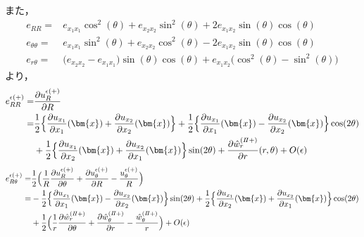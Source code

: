 また，
\begin{align}
	e_{RR}
		=&e_{x_{1}x_{1}}\cos^2(\theta)+e_{x_{2}x_{2}}\sin^2(\theta)+2e_{x_{1}x_{2}}\sin(\theta)\cos(\theta)
		\nonumber
		\\
	e_{\theta\theta}
		=&e_{x_{1}x_{1}}\sin^2(\theta)+e_{x_{2}x_{2}}\cos^2(\theta)-2e_{x_{1}x_{2}}\sin(\theta)\cos(\theta)
		\nonumber
		\\
	e_{r\theta}
		=&\bigl(e_{x_{2}x_{2}}-e_{x_{1}x_{1}}\bigr)\sin(\theta)\cos(\theta)+e_{x_{1}x_{2}}\bigl(\cos^2(\theta)-\sin^2(\theta)\bigr)
\end{align}
より，
\begin{align}
	e_{RR}^{\epsilon(+)}
		=&\frac{\partial u_{R}^{\epsilon(+)}}{\partial R}
		\nonumber
		\\
		=&\frac{1}{2}\Bigl\{ \frac{\partial u_{x_{1}}}{\partial x_{1}}(\bm{x})
			+\frac{\partial u_{x_{2}}}{\partial x_{2}}(\bm{x})\Bigr\}
		+\frac{1}{2}\Bigl\{ \frac{\partial u_{x_{1}}}{\partial x_{1}}(\bm{x})
			-\frac{\partial u_{x_{2}}}{\partial x_{2}}(\bm{x})\Bigr\}\cos(2\theta)
		\nonumber
		\\
		&+\frac{1}{2}\Bigl\{ \frac{\partial u_{x_{1}}}{\partial x_{2}}(\bm{x})
			+\frac{\partial u_{x_{2}}}{\partial x_{1}}(\bm{x})\Bigr\}\sin(2\theta)
		+\frac{\partial\hat{w}_{r}^{(I\hspace{-.15em}I+)}}{\partial r}(r,\theta)+O(\epsilon)
		\label{eq:eRROutEps}
\end{align}
\begin{align}
	e_{R\theta}^{\epsilon(+)}
		=&\frac{1}{2}\Bigl( \frac{1}{R}\frac{\partial u_{R}^{\epsilon(+)}}{\partial \theta}
			+\frac{\partial u_{\theta}^{\epsilon(+)}}{\partial R}-\frac{u_{\theta}^{\epsilon(+)}}{R}\Bigr)
		\nonumber
		\\
		=&-\frac{1}{2}\Bigl\{ \frac{\partial u_{x_{1}}}{\partial x_{1}}(\bm{x})
			-\frac{\partial u_{x_{2}}}{\partial x_{2}}(\bm{x})\Bigr\}\sin(2\theta)
		+\frac{1}{2}\Bigl\{ \frac{\partial u_{x_{1}}}{\partial x_{2}}(\bm{x})
			+\frac{\partial u_{x_{2}}}{\partial x_{1}}(\bm{x})\Bigr\}\cos(2\theta)
			\nonumber
			\\
		&+\frac{1}{2}\Bigl( \frac{1}{r}\frac{\partial \hat{w}_{r}^{(I\hspace{-.15em}I+)}}{\partial \theta}
			+\frac{\partial \hat{w}_{\theta}^{(I\hspace{-.15em}I+)}}{\partial r}
			-\frac{\hat{w}_{\theta}^{(I\hspace{-.15em}I+)}}{r}\Bigr)+O(\epsilon)
\end{align}
